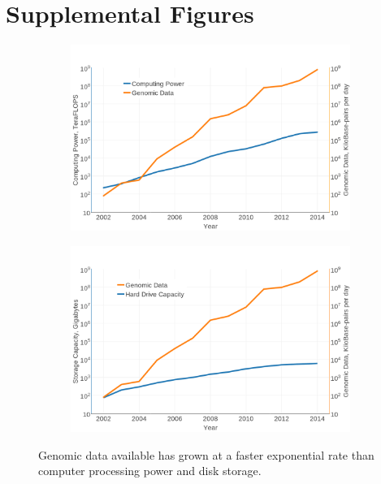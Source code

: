 \documentclass[review,preprint,12pt]{elsarticle}
\theoremstyle{definition}
\theoremstyle{remark}
\begin{document}
\renewcommand\thefigure{S\arabic{figure}}
\setcounter{figure}{0}
\renewcommand\thetable{S\arabic{table}}
\setcounter{table}{0}

\section{Supplemental Figures}
\begin{figure}[hbp]
    \centering
    \begin{subfigure}[b]{0.49\textwidth}
        \includegraphics[width=1\textwidth]{assets/computeVsData.png}
        \caption{}
    \end{subfigure}%
    \begin{subfigure}[b]{0.49\textwidth}
        \includegraphics[width=1\textwidth]{assets/storageVsData.png}
        \caption{}
    \end{subfigure}
    \caption{Genomic data available has grown at a faster exponential rate than computer processing power and disk storage.}
    \label{fig:expdata}
\end{figure}
\end{document}
